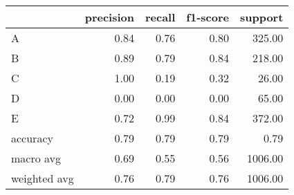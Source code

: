\begin{tabular}{|l|r|r|r|r|}
\hline
{} &  precision &  recall &  f1-score &  support \\
\hline
A            &       0.84 &    0.76 &      0.80 &   325.00 \\
B            &       0.89 &    0.79 &      0.84 &   218.00 \\
C            &       1.00 &    0.19 &      0.32 &    26.00 \\
D            &       0.00 &    0.00 &      0.00 &    65.00 \\
E            &       0.72 &    0.99 &      0.84 &   372.00 \\
accuracy     &       0.79 &    0.79 &      0.79 &     0.79 \\
macro avg    &       0.69 &    0.55 &      0.56 &  1006.00 \\
weighted avg &       0.76 &    0.79 &      0.76 &  1006.00 \\
\hline
\end{tabular}
